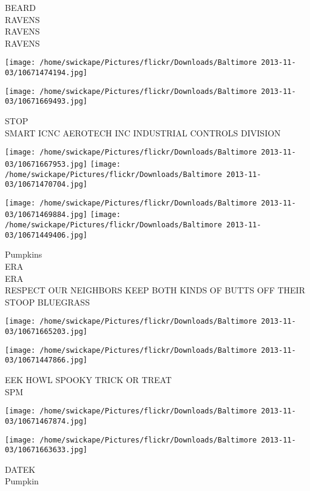 \documentclass[10pt,letterpaper]{article}
\begin{document}
BEARD\\
RAVENS\\
RAVENS\\
RAVENS\\
\pagebreak

\texttt{[image: /home/swickape/Pictures/flickr/Downloads/Baltimore 2013-11-03/10671474194.jpg]}

\vspace{0.25in}
\texttt{[image: /home/swickape/Pictures/flickr/Downloads/Baltimore 2013-11-03/10671669493.jpg]}

STOP\\
SMART ICNC AEROTECH INC INDUSTRIAL CONTROLS DIVISION\\
\pagebreak

\texttt{[image: /home/swickape/Pictures/flickr/Downloads/Baltimore 2013-11-03/10671667953.jpg]}
\texttt{[image: /home/swickape/Pictures/flickr/Downloads/Baltimore 2013-11-03/10671470704.jpg]}

\texttt{[image: /home/swickape/Pictures/flickr/Downloads/Baltimore 2013-11-03/10671469884.jpg]}
\texttt{[image: /home/swickape/Pictures/flickr/Downloads/Baltimore 2013-11-03/10671449406.jpg]}

Pumpkins\\
ERA\\
ERA\\
RESPECT OUR NEIGHBORS KEEP BOTH KINDS OF BUTTS OFF THEIR STOOP BLUEGRASS\\
\pagebreak

\texttt{[image: /home/swickape/Pictures/flickr/Downloads/Baltimore 2013-11-03/10671665203.jpg]}

\vspace{0.25in}
\texttt{[image: /home/swickape/Pictures/flickr/Downloads/Baltimore 2013-11-03/10671447866.jpg]}

EEK HOWL SPOOKY TRICK OR TREAT\\
SPM\\
\pagebreak

\texttt{[image: /home/swickape/Pictures/flickr/Downloads/Baltimore 2013-11-03/10671467874.jpg]}

\vspace{0.25in}
\texttt{[image: /home/swickape/Pictures/flickr/Downloads/Baltimore 2013-11-03/10671663633.jpg]}

DATEK\\
Pumpkin\\
\pagebreak
\end{document}

